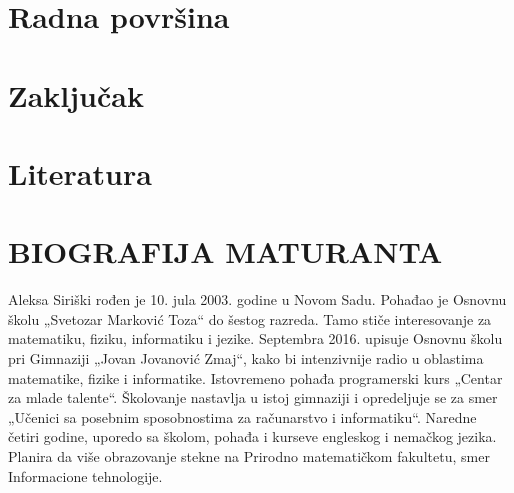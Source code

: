 \documentclass[a4paper,14pt]{article}
\begin{document}
\section{Radna površina}
\newpage

\section{Zaključak}
\newpage

\section{Literatura}
\newpage

\section{BIOGRAFIJA MATURANTA}
Aleksa Siriški rođen je 10. jula 2003. godine u Novom Sadu. Pohađao je Osnovnu školu „Svetozar Marković Toza“ do šestog razreda. Tamo stiče interesovanje za matematiku, fiziku, informatiku i jezike. Septembra 2016. upisuje Osnovnu školu pri Gimnaziji „Jovan Jovanović Zmaj“, kako bi intenzivnije radio u oblastima matematike, fizike i informatike. Istovremeno pohađa programerski kurs „Centar za mlade talente“. Školovanje nastavlja u istoj gimnaziji i opredeljuje se za smer „Učenici sa posebnim sposobnostima za računarstvo i informatiku“. Naredne četiri godine, uporedo sa školom, pohađa i kurseve engleskog i nemačkog jezika. Planira da više obrazovanje stekne na Prirodno matematičkom fakultetu, smer Informacione tehnologije.
\newpage
\end{document}
